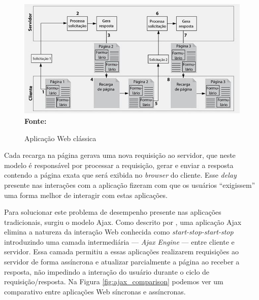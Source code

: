 \begin{figure}[!ht]
	\centering	
	\caption[\hspace{0.1cm}Aplicação Web clássica.]{Aplicação Web clássica}
	  \vspace{-0.4cm}
	\includegraphics[width=.8\textwidth]{figuras/arquitetura_web_tradicional.png}
	 \vspace{-0.3cm}
	\\\textbf{\footnotesize Fonte: \cite{deitelAjax}}
	\label{fig:arquitetura_web_tradicional}
\end{figure}

Cada recarga na página gerava uma nova requisição ao servidor, que neste modelo é responsável por processar a requisição, gerar e enviar a resposta 
contendo a página exata que será exibida no \textit{browser} do cliente. Esse \textit{delay} presente nas interações com a aplicação fizeram com que 
os usuários ``exigissem'' uma forma melhor de interagir com estas aplicações. 

Para solucionar este problema de desempenho presente nas aplicações tradicionais, surgiu o modelo Ajax. Como descrito por \cite{garrettAjax}, uma 
aplicação Ajax elimina a natureza da interação Web conhecida como \textit{start-stop-start-stop} introduzindo uma camada intermediária 
— \textit{Ajax Engine} — entre cliente e servidor. Essa camada permitiu a essas aplicações realizarem requisições ao servidor de forma assíncrona 
e atualizar parcialmente a página ao receber a resposta, não impedindo a interação do usuário durante o ciclo de requisição/resposta. Na 
Figura \ref{fig:ajax_comparison} podemos ver um comparativo entre aplicações Web síncronas e assíncronas.


